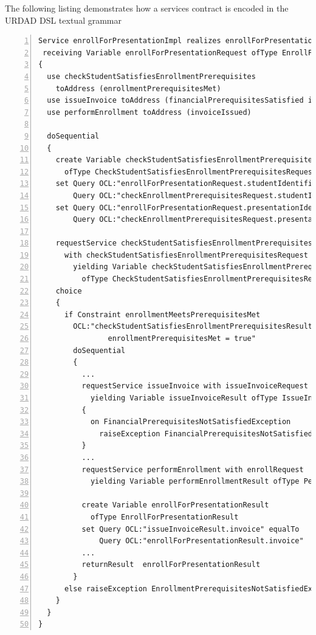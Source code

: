 The following listing demonstrates how a services contract is encoded in the URDAD DSL textual grammar
\tiny \begin{lstlisting}[numbers=left,escapechar=|]
Service enrollForPresentationImpl realizes enrollForPresentation 
 receiving Variable enrollForPresentationRequest ofType EnrollForPresentationRequest
{
  use checkStudentSatisfiesEnrollmentPrerequisites 
    toAddress (enrollmentPrerequisitesMet)
  use issueInvoice toAddress (financialPrerequisitesSatisfied invoiceIssued) 
  use performEnrollment toAddress (invoiceIssued)
   
  doSequential
  {
    create Variable checkStudentSatisfiesEnrollmentPrerequisitesRequest 
      ofType CheckStudentSatisfiesEnrollmentPrerequisitesRequest               
    set Query OCL:"enrollForPresentationRequest.studentIdentifier" equalTo 
        Query OCL:"checkEnrollmentPrerequisitesRequest.studentIdentifier"
    set Query OCL:"enrollForPresentationRequest.presentationIdentifier" equalTo
        Query OCL:"checkEnrollmentPrerequisitesRequest.presentationIdentifier"
                     
    requestService checkStudentSatisfiesEnrollmentPrerequisites 
      with checkStudentSatisfiesEnrollmentPrerequisitesRequest 
        yielding Variable checkStudentSatisfiesEnrollmentPrerequisitesResult
          ofType CheckStudentSatisfiesEnrollmentPrerequisitesResult
    choice
    {
      if Constraint enrollmentMeetsPrerequisitesMet 
        OCL:"checkStudentSatisfiesEnrollmentPrerequisitesResult.
                enrollmentPrerequisitesMet = true"
        doSequential
        {
          ...
          requestService issueInvoice with issueInvoiceRequest 
            yielding Variable issueInvoiceResult ofType IssueInvoiceResult
          {
            on FinancialPrerequisitesNotSatisfiedException 
              raiseException FinancialPrerequisitesNotSatisfiedException
          }
	      ...
          requestService performEnrollment with enrollRequest 
            yielding Variable performEnrollmentResult ofType PerformEnrollmentResult
          
          create Variable enrollForPresentationResult 
            ofType EnrollForPresentationResult
          set Query OCL:"issueInvoiceResult.invoice" equalTo
              Query OCL:"enrollForPresentationResult.invoice"
          ...                       
          returnResult  enrollForPresentationResult
        }
      else raiseException EnrollmentPrerequisitesNotSatisfiedException
    }
  }
}                 
\end{lstlisting}\normalsize
